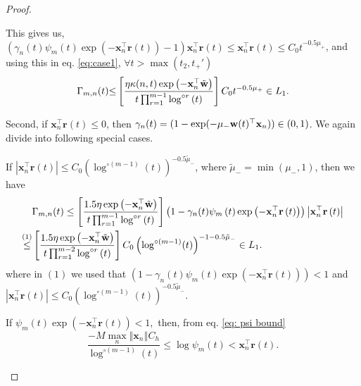 \documentclass[twoside,11pt,english]{article}
\begin{document}
\begin{proof}
\begin{asparaenum}
\begin{compactenum}
 This gives us, $\left(\gamma_n(t)\psi_m(t)\exp\left(-\mathbf{x}_{n}^{\top}\mathbf{r}\left(t\right)\right)-1\right)\mathbf{x}_{n}^{\top}\mathbf{r}\left(t\right)\le\mathbf{x}_{n}^{\top}\mathbf{r}\left(t\right)\le C_0t^{-0.5\mu_+}$, and using this in eq. \ref{eq:case1}, $\forall t>\max{(t_2,t_+')}$
\begin{align*}
 \Gamma_{m,n}(t)
{\leq} \left[\frac{\eta\kappa(n,t)\exp\left(-\mathbf{x}_{n}^{\top}\tilde{\mathbf{w}}\right)}{t\prod_{r=1}^{m-1}\log^{\circ r}\left(t\right)}\right]C_0t^{-0.5\mu_+}\in L_1.
\end{align*}
\end{compactenum}
\item Second, if $\mathbf{x}_{n}^{\top}\mathbf{r}\left(t\right)\leq0$, then $\gamma_n(t)=(1-\exp(-\mu_-\mathbf{w}(t)^\top\mathbf{x}_{n}))\in(0,1)$. We again  divide into following special cases. 
\begin{compactenum}
\item If $\left|\mathbf{x}_{n}^{\top}\mathbf{r}\left(t\right)\right|\le C_0\left(\log^{\circ (m-1)}(t)\right)^{-0.5\tilde{\mu}_-}$, where $\tilde\mu_-=\min{(\mu_-,1)}$, then we have 
\begin{align*}
 &\Gamma_{m,n}(t)\le \left[\frac{1.5 \eta\exp\left(-\mathbf{x}_{n}^{\top}\tilde{\mathbf{w}}\right)}{t\prod_{r=1}^{m-1}\log^{\circ r}\left(t\right)}\right]\left(1-\gamma_n(t)\psi_{m}\left(t\right)\exp\left(-\mathbf{x}_{n}^{\top}\mathbf{r}\left(t\right)\right)\right)\left|\mathbf{x}_{n}^{\top}\mathbf{r}\left(t\right)\right|\\
\overset{(1)}\leq & \left[\frac{1.5 \eta\exp\left(-\mathbf{x}_{n}^{\top}\tilde{\mathbf{w}}\right)}{t\prod_{r=1}^{m-2}\log^{\circ r}\left(t\right)}\right]C_0\left(\log^{\circ (m-1)}(t)\right)^{-1-0.5\tilde{\mu}_-}\in L_{1}.
\end{align*}
where in $(1)$ we used that $\left(1-\gamma_n(t)\psi_{m}\left(t\right)\exp\left(-\mathbf{x}_{n}^{\top}\mathbf{r}\left(t\right)\right)\right)<1$ and\\ $\left|\mathbf{x}_{n}^{\top}\mathbf{r}\left(t\right)\right|\le C_0\left(\log^{\circ (m-1)}(t)\right)^{-0.5\tilde{\mu}_-}$.
\item If  $\psi_{m}\left(t\right)\exp\left(-\mathbf{x}_{n}^{\top}\mathbf{r}\left(t\right)\right)<1,$
then, from eq. \ref{eq: psi bound} 
\begin{equation}\label{eq:tmp}
\frac{-M\max_{n}\left\Vert \mathbf{x}_{n}\right\Vert C_{h}}{\log^{\circ\left(m-1\right)}\left(t\right)}\leq\log\psi_{m}\left(t\right)<\mathbf{x}_{n}^{\top}\mathbf{r}\left(t\right).
\end{equation}

\end{compactenum}
\end{asparaenum}
\end{proof}
\end{document}
